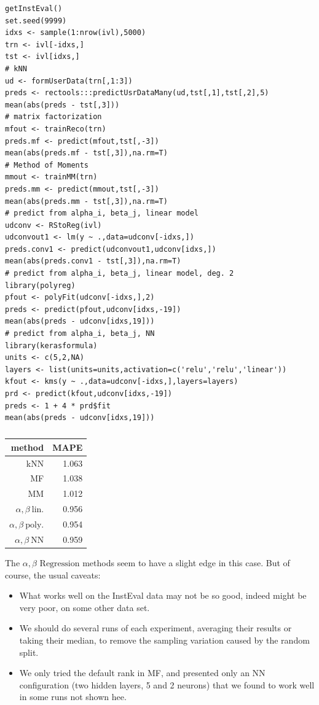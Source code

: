 \begin{lstlisting}
getInstEval()
set.seed(9999)
idxs <- sample(1:nrow(ivl),5000)
trn <- ivl[-idxs,]
tst <- ivl[idxs,]
# kNN
ud <- formUserData(trn[,1:3])
preds <- rectools:::predictUsrDataMany(ud,tst[,1],tst[,2],5)
mean(abs(preds - tst[,3]))
# matrix factorization
mfout <- trainReco(trn)
preds.mf <- predict(mfout,tst[,-3])
mean(abs(preds.mf - tst[,3]),na.rm=T)  
# Method of Moments
mmout <- trainMM(trn)
preds.mm <- predict(mmout,tst[,-3])  
mean(abs(preds.mm - tst[,3]),na.rm=T)
# predict from alpha_i, beta_j, linear model
udconv <- RStoReg(ivl)
udconvout1 <- lm(y ~ .,data=udconv[-idxs,])
preds.conv1 <- predict(udconvout1,udconv[idxs,])
mean(abs(preds.conv1 - tst[,3]),na.rm=T)  
# predict from alpha_i, beta_j, linear model, deg. 2
library(polyreg)
pfout <- polyFit(udconv[-idxs,],2) 
preds <- predict(pfout,udconv[idxs,-19]) 
mean(abs(preds - udconv[idxs,19])) 
# predict from alpha_i, beta_j, NN
library(kerasformula)
units <- c(5,2,NA)
layers <- list(units=units,activation=c('relu','relu','linear')) 
kfout <- kms(y ~ .,data=udconv[-idxs,],layers=layers) 
prd <- predict(kfout,udconv[idxs,-19]) 
preds <- 1 + 4 * prd$fit
mean(abs(preds - udconv[idxs,19]))
\end{lstlisting}

\begin{table}
\begin{center}
\vskip 0.5in
\begin{tabular}{|r|r|}
\hline
method & MAPE \\ \hline 
\hline
kNN & 1.063 \\ \hline 
MF & 1.038 \\ \hline 
MM & 1.012 \\ \hline 
$\alpha, \beta ~ \textrm{lin.}$ & 0.956 \\ \hline 
$\alpha, \beta ~ \textrm{poly.}$ & 0.954 \\ \hline 
$\alpha, \beta ~ \textrm{NN}$ & 0.959 \\ \hline 
\end{tabular}
\end{center}
\caption{}
\label{}
\end{table}

The $\alpha, \beta \textrm{ Regression}$ methods seem to have a slight
edge in this case.  But of course, the usual caveats:

\begin{itemize}

\item What works well on the InstEval data may not be so good, indeed
might be very poor, on some other data set.

\item We should do several runs of each experiment, averaging their
results or taking their median, to remove the sampling variation caused
by the random split.

\item We only tried the default rank in MF, and presented only an NN
configuration (two hidden layers, 5 and 2 neurons) that we found to
work well in some runs not shown hee.

\end{itemize} 
